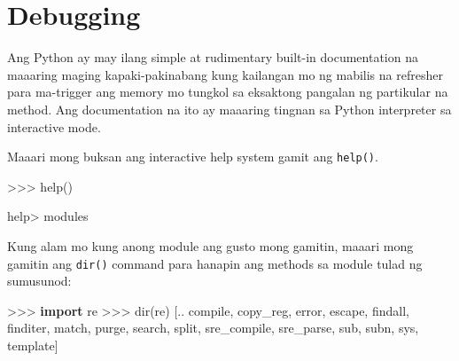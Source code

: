 \documentclass[10pt,]{book}
\newenvironment{Shaded}{}{}
\newcommand{\BuiltInTok}[1]{\textcolor[rgb]{0.00,0.50,0.00}{#1}}
\newcommand{\ImportTok}[1]{\textcolor[rgb]{0.00,0.50,0.00}{\textbf{#1}}}
\newcommand{\NormalTok}[1]{#1}
\newcommand{\OperatorTok}[1]{\textcolor[rgb]{0.40,0.40,0.40}{#1}}
\newcommand{\StringTok}[1]{\textcolor[rgb]{0.25,0.44,0.63}{#1}}
\begin{document}
\section{Debugging}\label{debugging-10}

Ang Python ay may ilang simple at rudimentary built-in documentation na
maaaring maging kapaki-pakinabang kung kailangan mo ng mabilis na
refresher para ma-trigger ang memory mo tungkol sa eksaktong pangalan ng
partikular na method. Ang documentation na ito ay maaaring tingnan sa
Python interpreter sa interactive mode.

Maaari mong buksan ang interactive help system gamit ang
\texttt{help()}.

\begin{Shaded}
\begin{Highlighting}[]
\OperatorTok{\textgreater{}\textgreater{}\textgreater{}} \BuiltInTok{help}\NormalTok{()}

\BuiltInTok{help}\OperatorTok{\textgreater{}}\NormalTok{ modules}
\end{Highlighting}
\end{Shaded}

Kung alam mo kung anong module ang gusto mong gamitin, maaari mong
gamitin ang \texttt{dir()} command para hanapin ang methods sa module
tulad ng sumusunod:

\begin{Shaded}
\begin{Highlighting}[]
\OperatorTok{\textgreater{}\textgreater{}\textgreater{}} \ImportTok{import}\NormalTok{ re}
\OperatorTok{\textgreater{}\textgreater{}\textgreater{}} \BuiltInTok{dir}\NormalTok{(re)}
\NormalTok{[.. }\StringTok{\textquotesingle{}compile\textquotesingle{}}\NormalTok{, }\StringTok{\textquotesingle{}copy\_reg\textquotesingle{}}\NormalTok{, }\StringTok{\textquotesingle{}error\textquotesingle{}}\NormalTok{, }\StringTok{\textquotesingle{}escape\textquotesingle{}}\NormalTok{, }\StringTok{\textquotesingle{}findall\textquotesingle{}}\NormalTok{,}
\StringTok{\textquotesingle{}finditer\textquotesingle{}}\NormalTok{, }\StringTok{\textquotesingle{}match\textquotesingle{}}\NormalTok{, }\StringTok{\textquotesingle{}purge\textquotesingle{}}\NormalTok{, }\StringTok{\textquotesingle{}search\textquotesingle{}}\NormalTok{, }\StringTok{\textquotesingle{}split\textquotesingle{}}\NormalTok{, }\StringTok{\textquotesingle{}sre\_compile\textquotesingle{}}\NormalTok{,}
\StringTok{\textquotesingle{}sre\_parse\textquotesingle{}}\NormalTok{, }\StringTok{\textquotesingle{}sub\textquotesingle{}}\NormalTok{, }\StringTok{\textquotesingle{}subn\textquotesingle{}}\NormalTok{, }\StringTok{\textquotesingle{}sys\textquotesingle{}}\NormalTok{, }\StringTok{\textquotesingle{}template\textquotesingle{}}\NormalTok{]}
\end{Highlighting}
\end{Shaded}
\end{document}
